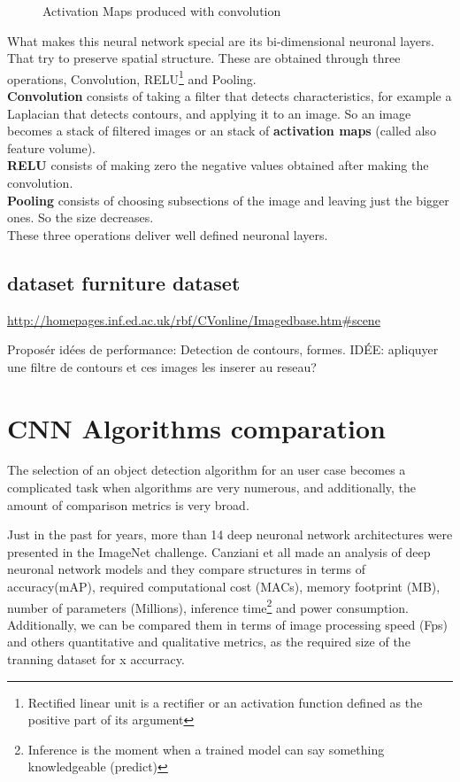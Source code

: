 \documentclass[10pt]{article}
\begin{document}
\begin{minipage}[t]{0.5\textwidth}
\begin{figure}[H]
    \caption{Activation Maps produced with convolution \cite{ConvolutionMap}}
\end{figure}
What makes this neural network special are its bi-dimensional neuronal layers. That try to preserve spatial structure. These are obtained through three operations, Convolution, RELU\footnote{ Rectified linear unit is a rectifier or an activation function defined as the positive part of its argument} and Pooling.\\
\textbf{Convolution} consists of taking a filter that detects characteristics, for example a Laplacian that detects contours, and applying it to an image. So an image becomes a stack of filtered images or an stack of \textbf{activation maps} (called also feature volume).\\
\textbf{RELU} consists of making zero the negative values obtained after making the convolution.\\
\textbf{Pooling} consists of choosing subsections of the image and leaving just the bigger ones. So the size decreases. \\
These three operations deliver well defined neuronal layers.
\end{minipage}



\subsection{dataset furniture dataset}
    \href{URL}{ http://homepages.inf.ed.ac.uk/rbf/CVonline/Imagedbase.htm#scene}

    
  Proposér idées de performance: Detection de contours, formes.
  IDÉE: apliquyer une filtre de contours et ces images les inserer au reseau?

    
\newpage    
\section{CNN Algorithms comparation}
The selection of an object detection algorithm for an user case becomes a complicated task when algorithms are very numerous, and additionally, the amount of comparison metrics is very broad. 

Just in the past for years, more than 14 deep neuronal network architectures were presented in the ImageNet challenge\cite{canziani2016analysis}. 
Canziani et all made an analysis of deep neuronal network models and they compare structures in terms of accuracy(mAP), required computational cost (MACs), memory footprint (MB), number of parameters (Millions), inference time\footnote{Inference is the moment when a trained model can say something knowledgeable (predict)} and power consumption.
Additionally, we can be compared them in terms of image processing speed (Fps) and others quantitative and qualitative metrics, as the required size of the tranning dataset for x accurracy.
\end{document}
